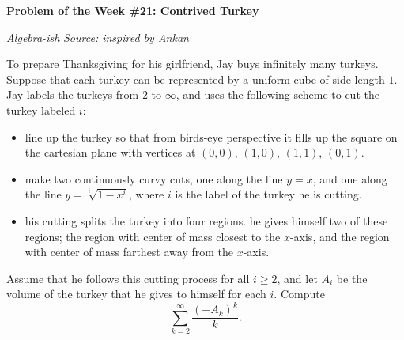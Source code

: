 \begin{potw}\vspace{5pt}
{\large\textbf{Problem of the Week \#21: Contrived Turkey}}\vspace{5pt}

\textit{Algebra-ish}\newline
\textit{Source: inspired by Ankan}\V

To prepare Thanksgiving for his girlfriend, Jay buys infinitely many turkeys. Suppose that each turkey can be represented by a uniform cube of side length $1$. Jay labels the turkeys from $2$ to $\infty$, and uses the following scheme to cut the turkey labeled $i$:
\begin{itemize}
    \item line up the turkey so that from birds-eye perspective it fills up the square on the cartesian plane with vertices at $(0,0)$, $(1,0)$, $(1,1)$, $(0,1)$. 
    \item make two continuously curvy cuts, one along the line $y=x$, and one along the line $y=\sqrt[i]{1-x^i}$, where $i$ is the label of the turkey he is cutting. 
    \item his cutting splits the turkey into four regions. he gives himself two of these regions; the region with center of mass closest to the $x$-axis, and the region with center of mass farthest away from the $x$-axis. 
\end{itemize}

Assume that he follows this cutting process for all $i\geq 2$, and let $A_i$ be the volume of the turkey that he gives to himself for each $i$. Compute
\[\sum_{k=2}^{\infty}\frac{(-A_k)^k}{k}.\]
\end{potw}\V
